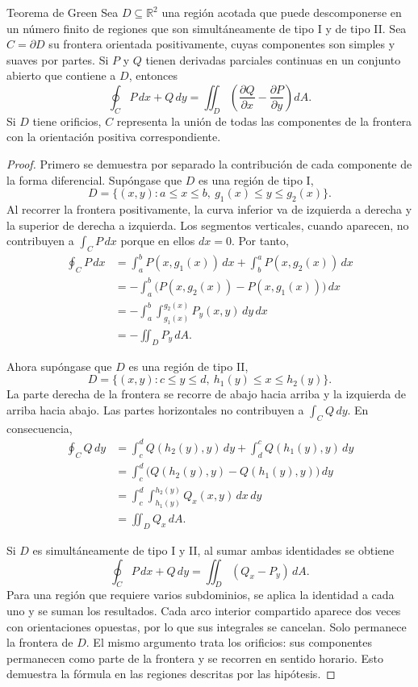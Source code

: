 \begin{mytheorem}{Teorema de Green}
Sea $D\subseteq\mathbb R^2$ una región acotada que puede descomponerse en un número finito de regiones que son simultáneamente de tipo I y de tipo II. Sea $C=\partial D$ su frontera orientada positivamente, cuyas componentes son simples y suaves por partes. Si $P$ y $Q$ tienen derivadas parciales continuas en un conjunto abierto que contiene a $D$, entonces
\[
\oint_C P\,dx+Q\,dy
=\iint_D\left(\frac{\partial Q}{\partial x}-
\frac{\partial P}{\partial y}\right)dA.
\]
Si $D$ tiene orificios, $C$ representa la unión de todas las componentes de la frontera con la orientación positiva correspondiente.
\end{mytheorem}

\begin{proof}
Primero se demuestra por separado la contribución de cada componente de la forma diferencial. Supóngase que $D$ es una región de tipo I,
\[
D=\{(x,y):a\leq x\leq b,\ g_1(x)\leq y\leq g_2(x)\}.
\]
Al recorrer la frontera positivamente, la curva inferior va de izquierda a derecha y la superior de derecha a izquierda. Los segmentos verticales, cuando aparecen, no contribuyen a $\int_C P\,dx$ porque en ellos $dx=0$. Por tanto,
\begin{align*}
\oint_C P\,dx
&=\int_a^b P(x,g_1(x))\,dx
  +\int_b^a P(x,g_2(x))\,dx\\
&=-\int_a^b\bigl(P(x,g_2(x))-P(x,g_1(x))\bigr)\,dx\\
&=-\int_a^b\int_{g_1(x)}^{g_2(x)}P_y(x,y)\,dy\,dx\\
&=-\iint_D P_y\,dA.
\end{align*}

Ahora supóngase que $D$ es una región de tipo II,
\[
D=\{(x,y):c\leq y\leq d,\ h_1(y)\leq x\leq h_2(y)\}.
\]
La parte derecha de la frontera se recorre de abajo hacia arriba y la izquierda de arriba hacia abajo. Las partes horizontales no contribuyen a $\int_C Q\,dy$. En consecuencia,
\begin{align*}
\oint_C Q\,dy
&=\int_c^d Q(h_2(y),y)\,dy
  +\int_d^c Q(h_1(y),y)\,dy\\
&=\int_c^d\bigl(Q(h_2(y),y)-Q(h_1(y),y)\bigr)\,dy\\
&=\int_c^d\int_{h_1(y)}^{h_2(y)}Q_x(x,y)\,dx\,dy\\
&=\iint_D Q_x\,dA.
\end{align*}

Si $D$ es simultáneamente de tipo I y II, al sumar ambas identidades se obtiene
\[
\oint_C P\,dx+Q\,dy
=\iint_D(Q_x-P_y)\,dA.
\]
Para una región que requiere varios subdominios, se aplica la identidad a cada uno y se suman los resultados. Cada arco interior compartido aparece dos veces con orientaciones opuestas, por lo que sus integrales se cancelan. Solo permanece la frontera de $D$. El mismo argumento trata los orificios: sus componentes permanecen como parte de la frontera y se recorren en sentido horario. Esto demuestra la fórmula en las regiones descritas por las hipótesis.
\end{proof}

